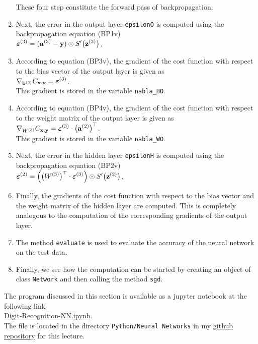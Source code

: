 \begin{enumerate}
      These four step constitute the forward pass of backpropagation.
\item Next, the error in the output layer \texttt{epsilonO} is computed using the backpropagation equation
      (BP1v)
      \\[0.2cm]
      \hspace*{1.3cm}
      $\displaystyle \boldsymbol{\varepsilon}^{(3)} = (\mathbf{a}^{(3)} - \mathbf{y}) \odot S'\bigl(\mathbf{z}^{(3)}\bigr)$.
\item According to  equation (BP3v), the gradient of the cost function with respect to the bias vector of the
      output layer is given as
      \\[0.2cm]
      \hspace*{1.3cm}
      $\displaystyle \nabla_{\mathbf{b}^{(3)}} C_{\mathbf{x}, \mathbf{y}} = \boldsymbol{\varepsilon}^{(3)}$.
      \\[0.2cm]
      This gradient is stored in the variable \texttt{nabla\_BO}.
\item According to equation (BP4v), the gradient  of the cost function with respect to the weight matrix of the
      output layer is given as
      \\[0.2cm]
      \hspace*{1.3cm}
      $\displaystyle \nabla_{W^{(3)}} C_{\mathbf{x}, \mathbf{y}} = \boldsymbol{\varepsilon}^{(3)} \cdot \bigl(\mathbf{a}^{(2)}\bigr)^\top$.
      \\[0.2cm]
      This gradient is stored in the variable \texttt{nabla\_WO}.
\item Next, the error in the hidden layer \texttt{epsilonH} is computed using the backpropagation equation
      (BP2v)
      \\[0.2cm]
      \hspace*{1.3cm}
      $\displaystyle \boldsymbol{\varepsilon}^{(2)} = \Bigl(\bigl(W^{(3)}\bigr)^\top \cdot \boldsymbol{\varepsilon}^{(3)}\Bigr) \odot
           S'\bigl(\mathbf{z}^{(2)}\bigr)
      $.
\item Finally, the gradients of the cost function with respect to the bias
      vector and the weight matrix of the hidden layer are computed.  This is completely analogous to the computation of
      the corresponding gradients of the output layer.
\item The method \texttt{evaluate} is used to evaluate the accuracy of the neural network on the test data.
\item Finally, we see how the computation can be started by creating an object of class \texttt{Network} and
      then calling the method \texttt{sgd}.
\end{enumerate}
The program discussed in this section is available as a jupyter notebook at the following link
\\[0.2cm]
\hspace*{1.3cm}
\href{https://github.com/karlstroetmann/Artificial-Intelligence/blob/master/Python/7%20Neural%20Networks/Digit-Recognition.ipynb}{Digit-Recognition-NN.ipynb}.
\\[0.2cm]
The file is located in the directory \texttt{Python/Neural Networks} in my
\href{https://github.com/karlstroetmann/Artificial-Intelligence}{github repository} for this lecture. 

